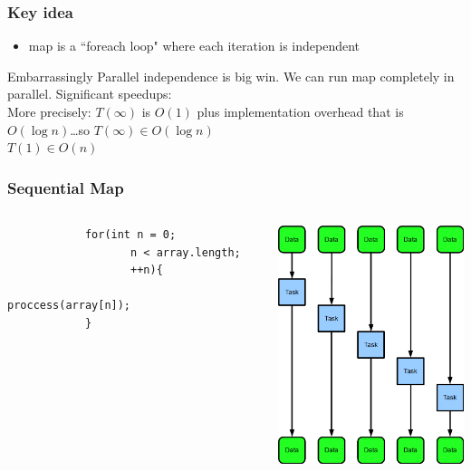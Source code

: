 \documentclass[xcolor=dvipsnames]{beamer}
\begin{document}
		\begin{frame} \frametitle{Key idea}
		\begin{itemize}
		\item map is a ``foreach loop" \pause 
		\alert{where each iteration is independent} \pause
		\end{itemize}
		\begin{block}{Embarrassingly Parallel}
		independence is big win.  We can run map completely in parallel.  Significant speedups:\\
	     More precisely: $T(\infty)$ is  $O(1)$ plus implementation overhead that is $O(\log{n})$\ldots so $T(\infty) \in O(\log n)$\\ 
	     $T(1) \in O(n)$
		\end{block}
		\end{frame}
		
		\begin{frame}[fragile] \frametitle{Sequential Map}
		\begin{columns}
			\begin{column}{0.5\textwidth}
			\begin{verbatim}
			for(int n = 0;
				   n < array.length;
				   ++n){
				        proccess(array[n]);
			}
			\end{verbatim}
		     \end{column}
  			\begin{column}{0.5\textwidth}
			\includegraphics[width=60mm]{images/map_serial.png}
		     \end{column}
		\end{columns}
		\end{frame}
		
\end{document}
